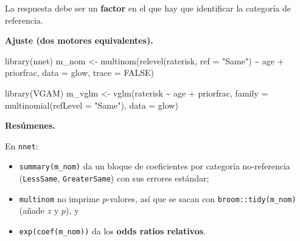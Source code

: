 \documentclass[
  letterpaper,
  DIV=11,
  numbers=noendperiod]{scrartcl}
\newenvironment{Shaded}{\begin{snugshade}}{\end{snugshade}}
\newcommand{\AttributeTok}[1]{\textcolor[rgb]{0.40,0.45,0.13}{#1}}
\newcommand{\ConstantTok}[1]{\textcolor[rgb]{0.56,0.35,0.01}{#1}}
\newcommand{\FunctionTok}[1]{\textcolor[rgb]{0.28,0.35,0.67}{#1}}
\newcommand{\NormalTok}[1]{\textcolor[rgb]{0.00,0.23,0.31}{#1}}
\newcommand{\OtherTok}[1]{\textcolor[rgb]{0.00,0.23,0.31}{#1}}
\newcommand{\SpecialCharTok}[1]{\textcolor[rgb]{0.37,0.37,0.37}{#1}}
\newcommand{\StringTok}[1]{\textcolor[rgb]{0.13,0.47,0.30}{#1}}
\providecommand{\tightlist}{%
  \setlength{\itemsep}{0pt}\setlength{\parskip}{0pt}}\usepackage{longtable,booktabs,array}
\begin{document}
\begin{tcolorbox}[enhanced jigsaw, breakable, colframe=quarto-callout-tip-color-frame, left=2mm, arc=.35mm, colbacktitle=quarto-callout-tip-color!10!white, toprule=.15mm, colback=white, coltitle=black, rightrule=.15mm, opacitybacktitle=0.6, title=\textcolor{quarto-callout-tip-color}{\faLightbulb}\hspace{0.5em}{🔧 En R. Ajustar e inspeccionar el multinomial nominal}, titlerule=0mm, toptitle=1mm, bottomtitle=1mm, leftrule=.75mm, bottomrule=.15mm, opacityback=0]

La respuesta debe ser un \textbf{factor} en el que hay que identificar
la categoría de referencia.

\textbf{Ajuste (dos motores equivalentes).}

\begin{Shaded}
\begin{Highlighting}[]
\FunctionTok{library}\NormalTok{(nnet)}
\NormalTok{m\_nom  }\OtherTok{\textless{}{-}} \FunctionTok{multinom}\NormalTok{(}\FunctionTok{relevel}\NormalTok{(raterisk, }\AttributeTok{ref =} \StringTok{"Same"}\NormalTok{) }\SpecialCharTok{\textasciitilde{}}\NormalTok{ age }\SpecialCharTok{+}\NormalTok{ priorfrac, }\AttributeTok{data =}\NormalTok{ glow, }\AttributeTok{trace =} \ConstantTok{FALSE}\NormalTok{)}

\FunctionTok{library}\NormalTok{(VGAM)}
\NormalTok{m\_vglm }\OtherTok{\textless{}{-}} \FunctionTok{vglm}\NormalTok{(raterisk }\SpecialCharTok{\textasciitilde{}}\NormalTok{ age }\SpecialCharTok{+}\NormalTok{ priorfrac,}
               \AttributeTok{family =} \FunctionTok{multinomial}\NormalTok{(}\AttributeTok{refLevel =} \StringTok{"Same"}\NormalTok{), }\AttributeTok{data =}\NormalTok{ glow)}
\end{Highlighting}
\end{Shaded}

\textbf{Resúmenes.}

En \texttt{nnet}:

\begin{itemize}
\tightlist
\item
  \texttt{summary(m\_nom)} da un bloque de coeficientes por categoría
  no-referencia (\texttt{Less\textbar{}Same},
  \texttt{Greater\textbar{}Same}) con sus errores estándar;
\item
  \texttt{multinom} no imprime \(p\)-valores, así que se sacan con
  \texttt{broom::tidy(m\_nom)} (añade \(z\) y \(p\)), y
\item
  \texttt{exp(coef(m\_nom))} da los \textbf{odds ratios relativos}.
\end{itemize}


\end{tcolorbox}
\end{document}
